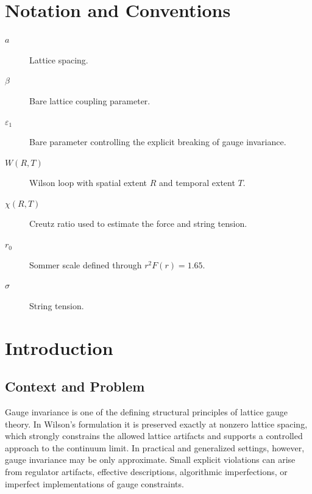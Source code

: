 \documentclass[12pt,a4paper,oneside,numbers=noenddot]{scrreprt}
\newcommand{\eps}{\varepsilon}
\newcommand{\latspacing}{a}
\newcommand{\wilsonloop}{W(R,T)}
\newcommand{\creutz}{\chi(R,T)}
\newcommand{\rzero}{r_0}
\newcommand{\stringtension}{\sigma}
\begin{document}
\begin{abstract}
This thesis investigates whether and how the continuum limit of a lattice gauge
theory is affected by small explicit violations of gauge invariance. The study
combines theoretical scaling arguments with numerical measurements of Wilson
loops, Creutz ratios, the static potential, the Sommer scale, and related
dimensionless observables. The central goal is to determine whether
gauge-breaking effects vanish, persist, or modify the extrapolation toward the
continuum limit as the lattice spacing is reduced.
\end{abstract}

\tableofcontents

\chapter*{Notation and Conventions}
\begin{description}
  \item[$\latspacing$] Lattice spacing.
  \item[$\beta$] Bare lattice coupling parameter.
  \item[$\eps_1$] Bare parameter controlling the explicit breaking of gauge invariance.
  \item[$\wilsonloop$] Wilson loop with spatial extent $R$ and temporal extent $T$.
  \item[$\creutz$] Creutz ratio used to estimate the force and string tension.
  \item[$\rzero$] Sommer scale defined through $r^2F(r)=1.65$.
  \item[$\stringtension$] String tension.
\end{description}

\chapter{Introduction}
\label{chap:introduction}

\section{Context and Problem}
Gauge invariance is one of the defining structural principles of lattice gauge
theory. In Wilson's formulation it is preserved exactly at nonzero lattice
spacing, which strongly constrains the allowed lattice artifacts and supports a
controlled approach to the continuum limit. In practical and generalized
settings, however, gauge invariance may be only approximate. Small explicit
violations can arise from regulator artifacts, effective descriptions,
algorithmic imperfections, or imperfect implementations of gauge constraints.
\end{document}
